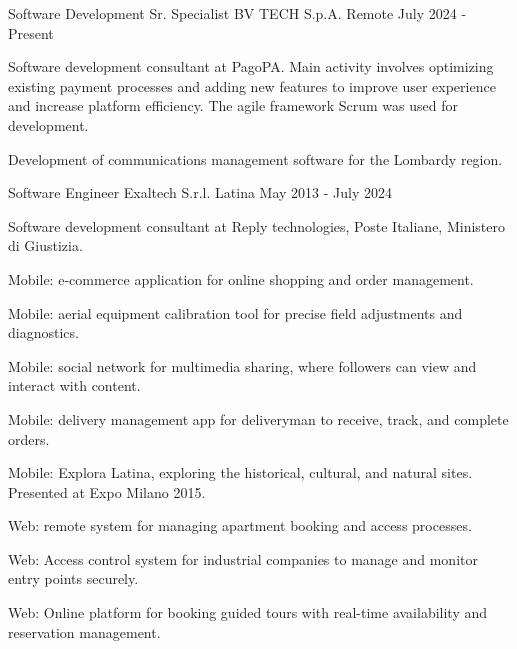 

\begin{cventries}

  \cventry
    {Software Development Sr. Specialist} %
    {BV TECH S.p.A.} %
    {Remote} %
    {July 2024 - Present} %
    {
      \begin{cvitems} %
        \item {Software development consultant at PagoPA. Main activity involves optimizing existing payment processes and adding new features to improve user experience and increase platform efficiency. The agile framework Scrum was used for development.}
        \item {Development of communications management software for the Lombardy region.}  
      \end{cvitems}
    }

  \cventry
    {Software Engineer} %
    {Exaltech S.r.l.} %
    {Latina} %
    {May 2013 - July 2024} %
    {
      \begin{cvitems} %
        \item {Software development consultant at Reply technologies, Poste Italiane, Ministero di Giustizia.}
        \item {Mobile: e-commerce application for online shopping and order management.}
        \item {Mobile: aerial equipment calibration tool for precise field adjustments and diagnostics.}
        \item {Mobile: social network for multimedia sharing, where followers can view and interact with content.}
        \item {Mobile: delivery management app for deliveryman to receive, track, and complete orders.}
        \item {Mobile: Explora Latina, exploring the historical, cultural, and natural sites. Presented at Expo Milano 2015.}
        \item {Web: remote system for managing apartment booking and access processes.}
        \item {Web: Access control system for industrial companies to manage and monitor entry points securely.}
        \item {Web: Online platform for booking guided tours with real-time availability and reservation management.}
      \end{cvitems}
    }

\end{cventries}
